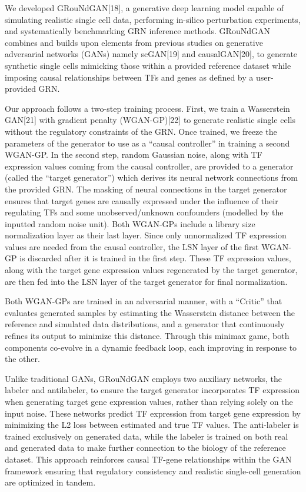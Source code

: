 We developed GRouNdGAN[18], a generative deep learning model capable of simulating realistic single cell data, performing in-silico perturbation experiments, and systematically benchmarking GRN inference methods. GRouNdGAN combines and builds upon elements from previous studies on generative adversarial networks (GANs) namely scGAN[19] and causalGAN[20], to generate synthetic single cells mimicking those within a provided reference dataset while imposing causal relationships between TFs and genes as defined by a user-provided GRN. 

Our approach follows a two-step training process. First, we train a Wasserstein GAN[21] with gradient penalty (WGAN-GP)[22] to generate realistic single cells without the regulatory constraints of the GRN. Once trained, we freeze the parameters of the generator to use as a “causal controller” in training a second WGAN-GP. In the second step, random Gaussian noise, along with TF expression values coming from the causal controller, are provided to a generator (called the “target generator”) which derives its neural network connections from the provided GRN. The masking of neural connections in the target generator ensures that target genes are causally expressed under the influence of their regulating TFs and some unobserved/unknown confounders (modelled by the inputted random noise unit). Both WGAN-GPs include a library size normalization layer as their last layer. Since only unnormalized TF expression values are needed from the causal controller, the LSN layer of the first WGAN-GP is discarded after it is trained in the first step. These TF expression values, along with the target gene expression values regenerated by the target generator, are then fed into the LSN layer of the target generator for final normalization.

Both WGAN-GPs are trained in an adversarial manner, with a “Critic” that evaluates generated samples by estimating the Wasserstein distance between the reference and simulated data distributions, and a generator that continuously refines its output to minimize this distance. Through this minimax game, both components co-evolve in a dynamic feedback loop, each
improving in response to the other.

Unlike traditional GANs, GRouNdGAN employs two auxiliary networks, the labeler and antilabeler, to ensure the target generator incorporates TF expression when generating target gene expression values, rather than relying solely on the input noise. These networks predict TF expression from target gene expression by minimizing the L2 loss between estimated and true TF values. The anti-labeler is trained exclusively on generated data, while the labeler is trained on both real and generated data to make further connection to the biology of the reference dataset. This approach reinforces causal TF-gene relationships within the GAN framework ensuring that regulatory consistency and realistic single-cell generation are optimized in tandem.

